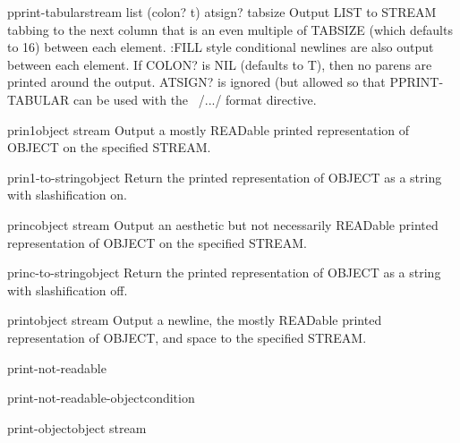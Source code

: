 \begin{function}{pprint-tabular}{stream list \op (colon? t) atsign? tabsize}{}
  Output LIST to STREAM tabbing to the next column that is an even multiple
   of TABSIZE (which defaults to 16) between each element. :FILL style
   conditional newlines are also output between each element. If COLON? is
   NIL (defaults to T), then no parens are printed around the output.
   ATSIGN? is ignored (but allowed so that PPRINT-TABULAR can be used with
   the ~/.../ format directive.
\end{function}

\begin{function}{prin1}{object \op stream}{}
  Output a mostly READable printed representation of OBJECT on the specified
  STREAM.
\end{function}

\begin{function}{prin1-to-string}{object}{}
  Return the printed representation of OBJECT as a string with
   slashification on.
\end{function}

\begin{function}{princ}{object \op stream}{}
  Output an aesthetic but not necessarily READable printed representation
  of OBJECT on the specified STREAM.
\end{function}

\begin{function}{princ-to-string}{object}{}
  Return the printed representation of OBJECT as a string with
  slashification off.
\end{function}

\begin{function}{print}{object \op stream}{}
  Output a newline, the mostly READable printed representation of OBJECT, and
  space to the specified STREAM.
\end{function}

\begin{condition-type}{print-not-readable}{}{}
  
\end{condition-type}

\begin{function}{print-not-readable-object}{condition}{}
  
\end{function}

\begin{generic}{print-object}{object stream}{}
  
\end{generic}

